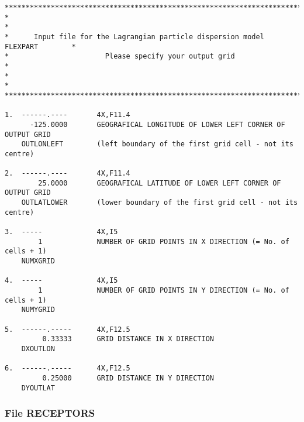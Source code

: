 \documentclass{egu}                  %
\begin{document}
\begin{scriptsize}\begin{verbatim}
********************************************************************************
*                                                                              *
*      Input file for the Lagrangian particle dispersion model FLEXPART        *
*                       Please specify your output grid                        *
*                                                                              *
********************************************************************************

1.  ------.----       4X,F11.4
      -125.0000       GEOGRAFICAL LONGITUDE OF LOWER LEFT CORNER OF OUTPUT GRID
    OUTLONLEFT        (left boundary of the first grid cell - not its centre)

2.  ------.----       4X,F11.4
        25.0000       GEOGRAFICAL LATITUDE OF LOWER LEFT CORNER OF OUTPUT GRID
    OUTLATLOWER       (lower boundary of the first grid cell - not its centre)

3.  -----             4X,I5
        1             NUMBER OF GRID POINTS IN X DIRECTION (= No. of cells + 1)
    NUMXGRID

4.  -----             4X,I5
        1             NUMBER OF GRID POINTS IN Y DIRECTION (= No. of cells + 1)
    NUMYGRID

5.  ------.-----      4X,F12.5
         0.33333      GRID DISTANCE IN X DIRECTION
    DXOUTLON

6.  ------.-----      4X,F12.5
         0.25000      GRID DISTANCE IN Y DIRECTION
    DYOUTLAT
\end{verbatim}\end{scriptsize}

\newpage

\subsubsection{File RECEPTORS}
\end{document}
